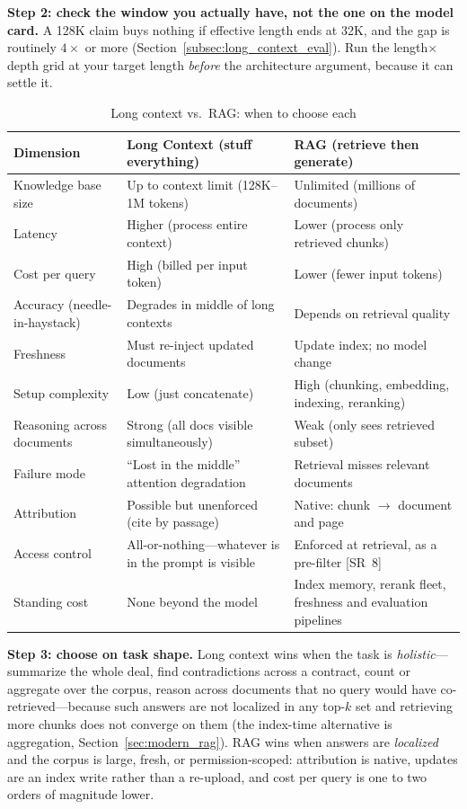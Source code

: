 \textbf{Step 2: check the window you actually have, not the one on the model card.} A 128K claim buys nothing if effective length ends at 32K, and the gap is routinely $4\times$ or more (Section~\ref{subsec:long_context_eval}). Run the length$\times$depth grid at your target length \emph{before} the architecture argument, because it can settle it.

\begin{table}[H]
\centering
\caption{Long context vs.\ RAG: when to choose each}
\begin{tabularx}{\textwidth}{lXX}
\toprule
\textbf{Dimension} & \textbf{Long Context (stuff everything)} & \textbf{RAG (retrieve then generate)} \\
\midrule
Knowledge base size & Up to context limit (128K--1M tokens) & Unlimited (millions of documents) \\
Latency & Higher (process entire context) & Lower (process only retrieved chunks) \\
Cost per query & High (billed per input token) & Lower (fewer input tokens) \\
Accuracy (needle-in-haystack) & Degrades in middle of long contexts & Depends on retrieval quality \\
Freshness & Must re-inject updated documents & Update index; no model change \\
Setup complexity & Low (just concatenate) & High (chunking, embedding, indexing, reranking) \\
Reasoning across documents & Strong (all docs visible simultaneously) & Weak (only sees retrieved subset) \\
Failure mode & ``Lost in the middle'' attention degradation & Retrieval misses relevant documents \\
Attribution & Possible but unenforced (cite by passage) & Native: chunk $\to$ document and page \\
Access control & All-or-nothing---whatever is in the prompt is visible & Enforced at retrieval, as a pre-filter [SR~8] \\
Standing cost & None beyond the model & Index memory, rerank fleet, freshness and evaluation pipelines \\
\bottomrule
\end{tabularx}
\end{table}

\textbf{Step 3: choose on task shape.} Long context wins when the task is \emph{holistic}---summarize the whole deal, find contradictions across a contract, count or aggregate over the corpus, reason across documents that no query would have co-retrieved---because such answers are not localized in any top-$k$ set and retrieving more chunks does not converge on them (the index-time alternative is aggregation, Section~\ref{sec:modern_rag}). RAG wins when answers are \emph{localized} and the corpus is large, fresh, or permission-scoped: attribution is native, updates are an index write rather than a re-upload, and cost per query is one to two orders of magnitude lower.

